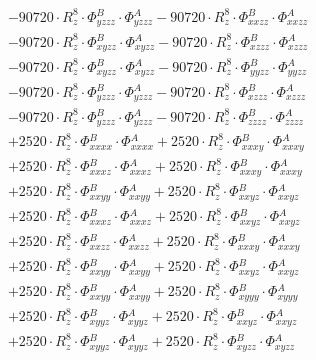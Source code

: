 \documentclass{article}
\begin{document}
\begin{subequations}
\begin{gather}
\begin{array}{c}
 \\[0.2em] 		 - 90720 \cdot R_{z}^{8} \cdot \Phi{}^{B}_{yzzz} \cdot \Phi{}^{A}_{yzzz}- 90720 \cdot R_{z}^{8} \cdot \Phi{}^{B}_{xxzz} \cdot \Phi{}^{A}_{xxzz} 
 \\[0.2em] 		 - 90720 \cdot R_{z}^{8} \cdot \Phi{}^{B}_{xyzz} \cdot \Phi{}^{A}_{xyzz}- 90720 \cdot R_{z}^{8} \cdot \Phi{}^{B}_{xzzz} \cdot \Phi{}^{A}_{xzzz} 
 \\[0.2em] 		 - 90720 \cdot R_{z}^{8} \cdot \Phi{}^{B}_{xyzz} \cdot \Phi{}^{A}_{xyzz}- 90720 \cdot R_{z}^{8} \cdot \Phi{}^{B}_{yyzz} \cdot \Phi{}^{A}_{yyzz} 
 \\[0.2em] 		 - 90720 \cdot R_{z}^{8} \cdot \Phi{}^{B}_{yzzz} \cdot \Phi{}^{A}_{yzzz}- 90720 \cdot R_{z}^{8} \cdot \Phi{}^{B}_{xzzz} \cdot \Phi{}^{A}_{xzzz} 
 \\[0.2em] 		 - 90720 \cdot R_{z}^{8} \cdot \Phi{}^{B}_{yzzz} \cdot \Phi{}^{A}_{yzzz}- 90720 \cdot R_{z}^{8} \cdot \Phi{}^{B}_{zzzz} \cdot \Phi{}^{A}_{zzzz} 
 \\[0.2em] 		 + 2520 \cdot R_{z}^{8} \cdot \Phi{}^{B}_{xxxx} \cdot \Phi{}^{A}_{xxxx}+ 2520 \cdot R_{z}^{8} \cdot \Phi{}^{B}_{xxxy} \cdot \Phi{}^{A}_{xxxy} 
 \\[0.2em] 		 + 2520 \cdot R_{z}^{8} \cdot \Phi{}^{B}_{xxxz} \cdot \Phi{}^{A}_{xxxz}+ 2520 \cdot R_{z}^{8} \cdot \Phi{}^{B}_{xxxy} \cdot \Phi{}^{A}_{xxxy} 
 \\[0.2em] 		 + 2520 \cdot R_{z}^{8} \cdot \Phi{}^{B}_{xxyy} \cdot \Phi{}^{A}_{xxyy}+ 2520 \cdot R_{z}^{8} \cdot \Phi{}^{B}_{xxyz} \cdot \Phi{}^{A}_{xxyz} 
 \\[0.2em] 		 + 2520 \cdot R_{z}^{8} \cdot \Phi{}^{B}_{xxxz} \cdot \Phi{}^{A}_{xxxz}+ 2520 \cdot R_{z}^{8} \cdot \Phi{}^{B}_{xxyz} \cdot \Phi{}^{A}_{xxyz} 
 \\[0.2em] 		 + 2520 \cdot R_{z}^{8} \cdot \Phi{}^{B}_{xxzz} \cdot \Phi{}^{A}_{xxzz}+ 2520 \cdot R_{z}^{8} \cdot \Phi{}^{B}_{xxxy} \cdot \Phi{}^{A}_{xxxy} 
 \\[0.2em] 		 + 2520 \cdot R_{z}^{8} \cdot \Phi{}^{B}_{xxyy} \cdot \Phi{}^{A}_{xxyy}+ 2520 \cdot R_{z}^{8} \cdot \Phi{}^{B}_{xxyz} \cdot \Phi{}^{A}_{xxyz} 
 \\[0.2em] 		 + 2520 \cdot R_{z}^{8} \cdot \Phi{}^{B}_{xxyy} \cdot \Phi{}^{A}_{xxyy}+ 2520 \cdot R_{z}^{8} \cdot \Phi{}^{B}_{xyyy} \cdot \Phi{}^{A}_{xyyy} 
 \\[0.2em] 		 + 2520 \cdot R_{z}^{8} \cdot \Phi{}^{B}_{xyyz} \cdot \Phi{}^{A}_{xyyz}+ 2520 \cdot R_{z}^{8} \cdot \Phi{}^{B}_{xxyz} \cdot \Phi{}^{A}_{xxyz} 
 \\[0.2em] 		 + 2520 \cdot R_{z}^{8} \cdot \Phi{}^{B}_{xyyz} \cdot \Phi{}^{A}_{xyyz}+ 2520 \cdot R_{z}^{8} \cdot \Phi{}^{B}_{xyzz} \cdot \Phi{}^{A}_{xyzz} 

\end{array}
\end{gather}
\end{subequations}
\end{document}

